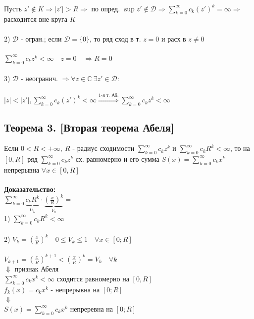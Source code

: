 \documentclass[a4paper,12pt]{article} %
\begin{document}
 \ \\
 Пусть $z' \notin K \Rightarrow |z'| > R \Rightarrow$ по опред. $\sup z' \notin \mathscr{D} \Rightarrow  \sum\limits_{k = 0}^\infty c_k (z')^k = \infty \Rightarrow$ расходится вне круга $K$\\
 \ \\
 2) $\mathscr{D}$ - огран.;  если $\mathscr{D} = \{0\}$, то ряд сход в т. $z = 0$ и расх в $z \neq 0$\\
 \ \\
 $ \sum\limits_{k = 0}^\infty c_k z^k < \infty \quad z = 0 \quad \Rightarrow R = 0$\\
 \ \\
 3) $\mathscr{D}$ - неогранич. $\Rightarrow \forall z \in \mathbb{C} \  \exists z'  \in \mathscr{D}:$\\
 \ \\
 $|z| < |z'|,  \sum\limits_{k = 0}^\infty c_k (z')^k < \infty \stackrel{\text{1-я т. Аб.}}{\Rightarrow}  \sum\limits_{k = 0}^\infty c_k z^k < \infty$\\
 \subsection*{Теорема 3. [Вторая теорема Абеля]}
 \noindent Если $0<R<+\infty, \  R$ - радиус сходимости $\sum\limits_{k = 0}^\infty c_k z^k$  и $\sum\limits_{k = 0}^\infty c_k R^k < \infty$, то на $[0, R]$ ряд $\sum\limits_{k = 0}^\infty c_k z^k$ сх. равномерно и его сумма $S(x) = \sum\limits_{k = 0}^\infty c_k x^k$ непрерывна $\forall x \in [0, R]$\\
 \ \\
\noindent\textbf{Доказательство:}\\
$ \sum\limits_{k = 0}^\infty \underbrace{c_k R^k}_{U_k} \cdot \underbrace{\left(\frac{x}{R}\right)^k}_{V_k} =
$ \\
1) $\sum\limits_{k = 0}^\infty c_k R^k < \infty $ \\
\ \\
2) $V_k =  \left( \frac{x}{R} \right)^k \quad 0 \leqslant V_k \leqslant 1 \quad \forall x \in [0; R]$ \\
\ \\
  $V_{k + 1} = \left( \frac{x}{R} \right)^{k + 1}  < \left( \frac{x}{R} \right)^k = V_k \quad \forall k$\\
\hspace*{3 cm}$\Downarrow$ признак Абеля \\
$\sum\limits_{k = 0}^\infty c_k x^k < \infty$ сходится равномерно на $[0, R]$\\
$f_k(x) = c_k x^k$  - непрерывна на $[0; R]$\\
\hspace*{3 cm}$
\Downarrow
$\\
$
S(x) = \sum\limits_{k = 0}^\infty c_k x^k$ непреревна на $[0; R]$\\
\end{document}

